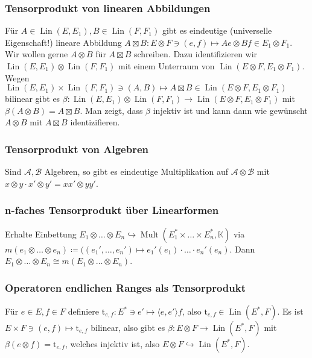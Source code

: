 \documentclass[11pt,a4paper]{scrartcl}
\newcommand{\K}{\mathbb{K}} %
\newcommand{\A}{\mathcal{A}}
\newcommand{\B}{\mathcal{B}}
\theoremstyle{plain}
\theoremstyle{definition}
\theoremstyle{remark}
\DeclareMathOperator{\Lin}{Lin}
\DeclareMathOperator{\Mult}{Mult}
\begin{document}
\subsubsection{Tensorprodukt von linearen Abbildungen}

Für $A\in \Lin(E,E_1), B\in \Lin(F,F_1)$ gibt es eindeutige (universelle Eigenschaft!) lineare Abbildung $A\boxtimes B: E\otimes F \ni (e,f)\mapsto Ae\otimes Bf \in E_1\otimes F_1$. Wir wollen gerne $A\otimes B$ für $A\boxtimes B$ schreiben. Dazu identifizieren wir $\Lin(E,E_1)\otimes \Lin(F,F_1)$ mit einem Unterraum von $\Lin(E\otimes F, E_1\otimes F_1)$. Wegen $\Lin(E,E_1)\times \Lin(F,F_1) \ni (A,B) \mapsto A\boxtimes B \in \Lin(E\otimes F, E_1\otimes F_1)$ bilinear gibt es $\beta: \Lin(E,E_1)\otimes \Lin(F,F_1) \to \Lin(E\otimes F, E_1\otimes F_1)$ mit $\beta(A\otimes B) = A\boxtimes B$. Man zeigt, dass $\beta$ injektiv ist und kann dann wie gewünscht $A\otimes B$ mit $A\boxtimes B$ identizifieren.

\subsubsection{Tensorprodukt von Algebren}

Sind $\A,\B$ Algebren, so gibt es eindeutige Multiplikation auf $\A\otimes \B$ mit $x\otimes y \cdot x'\otimes y' = xx'\otimes yy'$.

\subsubsection{n-faches Tensorprodukt über Linearformen}

Erhalte Einbettung $E_1\otimes \dots \otimes E_n \hookrightarrow \Mult(E_1^*\times \dots \times E_n^*, \K)$ via $m(e_1\otimes \dots \otimes e_n) \coloneqq ((e_1', \dots, e_n')\mapsto e_1'(e_1)\cdot \dots \cdot e_n'(e_n)$. Dann $E_1\otimes \dots \otimes E_n \cong m(E_1\otimes \dots \otimes E_n)$.

\subsubsection{Operatoren endlichen Ranges als Tensorprodukt}

Für $e\in E, f\in F$ definiere $\mathrm{t}_{e,f}: E^*\ni e' \mapsto \langle e, e' \rangle f$, also $\mathrm{t}_{e,f}\in \Lin(E^*,F)$. Es ist $E\times F \ni (e,f) \mapsto \mathrm{t}_{e,f}$ bilinear, also gibt es $\beta: E\otimes F \to \Lin(E^*,F)$ mit $\beta(e\otimes f) = \mathrm{t}_{e,f}$, welches injektiv ist, also $E\otimes F \hookrightarrow \Lin(E^*,F)$.
\end{document}
